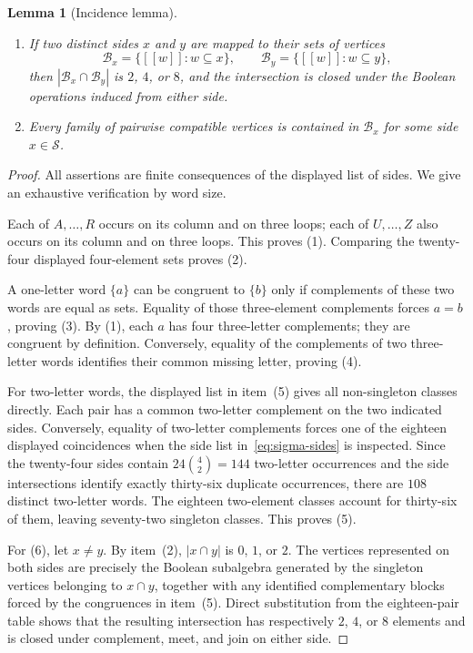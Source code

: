 \documentclass{article}   	%
\theoremstyle{plain}
\newtheorem{lemma}[theorem]{Lemma}
\theoremstyle{definition}
\theoremstyle{remark}
\begin{document}
\begin{lemma}[Incidence lemma]
\begin{enumerate}
      themselves.  Hence no congruence class of two-letter words has more than
      two members.
\item If two distinct sides $x$ and $y$ are mapped to their sets of vertices
      \[
      \mathcal B_x=\{[[w]]:w\subseteq x\},\qquad
      \mathcal B_y=\{[[w]]:w\subseteq y\},
      \]
      then $|\mathcal B_x\cap\mathcal B_y|$ is $2$, $4$, or $8$, and the
      intersection is closed under the Boolean operations induced from either
      side.
\item Every family of pairwise compatible vertices is contained in
      $\mathcal B_x$ for some side $x\in\mathcal S$.
\end{enumerate}
\end{lemma}

\begin{proof}
All assertions are finite consequences of the displayed list of sides.  We give
an exhaustive verification by word size.

Each of $A,\ldots,R$ occurs on its column and on three loops; each of
$U,\ldots,Z$ also occurs on its column and on three loops.  This proves (1).
Comparing the twenty-four displayed four-element sets proves (2).

A one-letter word $\{a\}$ can be congruent to $\{b\}$ only if complements of
these two words are equal as sets.  Equality of those three-element complements
forces $a=b$, proving (3).  By (1), each $a$ has four three-letter complements;
they are congruent by definition.  Conversely, equality of the complements of
two three-letter words identifies their common missing letter, proving (4).

For two-letter words, the displayed list in item~(5) gives all
non-singleton classes directly.  Each pair has a common two-letter complement
on the two indicated sides.  Conversely, equality of two-letter complements
forces one of the eighteen displayed coincidences when the side list
in~\eqref{eq:sigma-sides} is inspected.  Since the twenty-four sides contain
$24\binom{4}{2}=144$ two-letter occurrences and the side intersections identify
exactly thirty-six duplicate occurrences, there are $108$ distinct two-letter
words.  The eighteen two-element classes account for thirty-six of them, leaving
seventy-two singleton classes.  This proves (5).

For (6), let $x\ne y$.  By item~(2), $|x\cap y|$ is $0$, $1$, or $2$.  The
vertices represented on both sides are precisely the Boolean subalgebra
generated by the singleton vertices belonging to $x\cap y$, together with any
identified complementary blocks forced by the congruences in item~(5).
Direct substitution from the eighteen-pair table shows that the resulting
intersection has respectively $2$, $4$, or $8$ elements and is closed under
complement, meet, and join on either side.


\end{proof}
\end{document}

